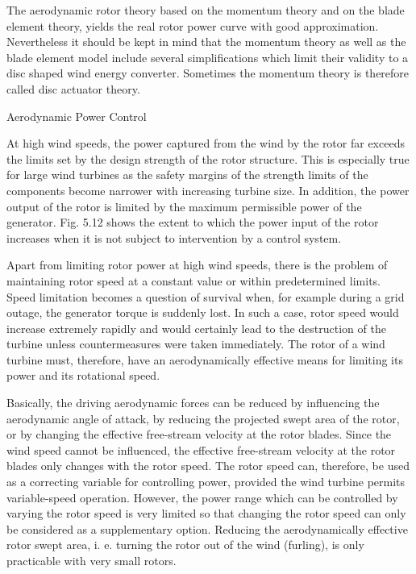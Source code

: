 The aerodynamic rotor theory based on the momentum theory and on the blade element theory, yields the real rotor power curve with good approximation. Nevertheless it should be kept in mind that the momentum theory as well as the blade element model include several simplifications which limit their validity to a disc shaped wind energy converter. Sometimes the momentum theory is therefore called disc actuator theory. 

Aerodynamic Power Control

At high wind speeds, the power captured from the wind by the rotor far exceeds the limits set by the design strength of the rotor structure. This is especially true for large wind turbines as the safety margins of the strength limits of the components become narrower with increasing turbine size. In addition, the power output of the rotor is limited by the maximum permissible power of the generator. Fig. 5.12 shows the extent to which the power input of the rotor increases when it is not subject to intervention by a control system.

Apart from limiting rotor power at high wind speeds, there is the problem of maintaining rotor speed at a constant value or within predetermined limits. Speed limitation becomes a question of survival when, for example during a grid outage, the generator torque is suddenly lost. %
In such a case, rotor speed would increase extremely rapidly and would certainly lead to the destruction of the turbine unless countermeasures were taken immediately. The rotor of a wind turbine must, therefore, have an aerodynamically effective means for limiting its power and its rotational speed.

Basically, the driving aerodynamic forces can be reduced by influencing the aerodynamic angle of attack, by reducing the projected swept area of the rotor, or by changing the effective free-stream velocity at the rotor blades. Since the wind speed cannot be influenced, the effective free-stream velocity at the rotor blades only changes with the rotor speed. The rotor speed can, therefore, be used as a correcting variable for controlling power, provided the wind turbine permits variable-speed operation. However, the power range which can be controlled by varying the rotor speed is very limited so that changing the rotor speed can only be considered as a supplementary option. Reducing the aerodynamically effective rotor swept area, i. e. turning the rotor out of the wind (furling), is only practicable with very small rotors.

